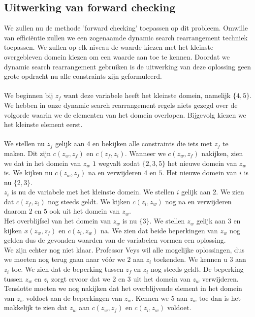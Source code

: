 \documentclass[alternative-exam.tex]{subfiles}
\begin{document}
\subsection{Uitwerking van forward checking}
We zullen nu de methode 'forward checking' toepassen op dit probleem. Omwille van effici\"entie zullen we een zogenaamde dynamic search rearrangement techniek toepassen. We zullen op elk niveau de waarde kiezen met het kleinste overgebleven domein kiezen om een waarde aan toe te kennen.
Doordat we dynamic search rearrangement gebruiken is de uitwerking van deze oplossing geen grote opdracht nu alle constraints zijn geformuleerd.\\\\
We beginnen bij $z_f$ want deze variabele heeft het kleinste domein, namelijk $\{4,5\}$. We hebben in onze dynamic search rearrangement regels niets gezegd over de volgorde waarin we de elementen van het domein overlopen. Bijgevolg kiezen we het kleinste element eerst.\\\\
We stellen nu $z_f$ gelijk aan $4$ en bekijken alle constraints die iets met $z_f$ te maken. Dit zijn $c(z_w,z_f)$ en $c(z_f,z_i)$. Wanneer we $c(z_w,z_f)$ nakijken, zien we dat in het domein van $z_w$ $1$ wegvalt zodat $\{2,3,5\}$ het nieuwe domein van $z_w$ is. We kijken nu $c(z_w,z_f)$ na en verwijderen $4$ en $5$. Het nieuwe domein van $i$ is nu $\{2,3\}$.\\
$z_i$ is nu de variabele met het kleinste domein. We stellen $i$ gelijk aan $2$. We zien dat $c(z_f,z_i)$ nog steeds geldt. We kijken $c(z_i,z_w)$ nog na en verwijderen daarom $2$ en $5$ ook uit het domein van $z_w$.\\ Het overblijfsel van het domein van $z_w$ is nu $\{3\}$. We stellen $z_w$ gelijk aan $3$ en kijken $x(z_w,z_f)$ en $c(z_i,z_w)$ na. We zien dat beide beperkingen van $z_w$ nog gelden dus de gevonden waarden van de variabelen vormen een oplossing.\\We zijn echter nog niet klaar. Professor Veys wil alle mogelijke oplossingen, dus we moeten nog terug gaan naar v\'o\'or we $2$ aan $z_i$ toekenden. We kennen u $3$ aan $z_i$ toe. We zien dat de beperking tussen $z_f$ en $z_i$ nog steeds geldt. De beperking tussen $z_w$ en $z_i$ zorgt ervoor dat we $2$ en $3$ uit het domein van $z_w$ verwijderen. Tenslotte moeten we nog nakijken dat het overblijvende element in het domein van $z_w$ voldoet aan de beperkingen van $z_w$.
Kennen we $5$ aan $z_w$ toe dan is het makkelijk te zien dat $z_w$ aan $c(z_w,z_f)$ en $c(z_i,z_w)$ voldoet.\\\\
\end{document}

